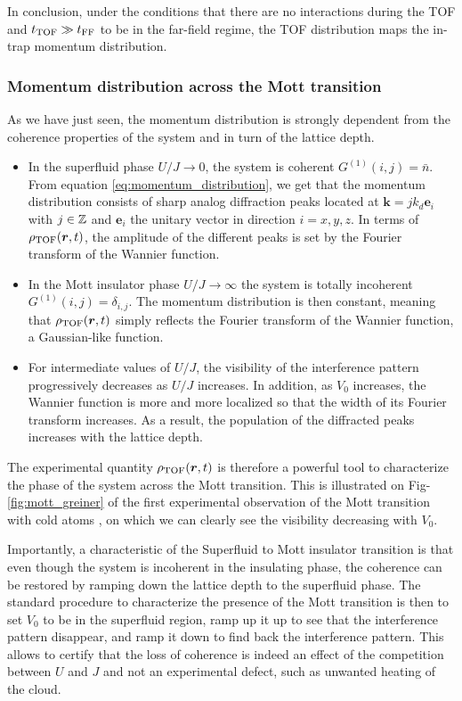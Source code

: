 In conclusion, under the conditions that there are no interactions during the TOF and $t_{\rm{TOF}} \gg t_{\rm{FF}}$ to be in the far-field regime, the TOF distribution maps the in-trap momentum distribution. 

\subsubsection{Momentum distribution across the Mott transition}

As we have just seen, the momentum distribution is strongly dependent from the coherence properties of the system and in turn of the lattice depth.

\begin{itemize}
    \item In the superfluid phase $U/J \to 0$, the system is coherent $G^{(1)}(i,j) = \bar{n}$. From equation \ref{eq:momentum_distribution}, we get that the momentum distribution consists of sharp analog diffraction peaks located at $\bm{k} = j k_d \bm{e}_i$ with $j \in \mathbb{Z}$ and $\bm{e}_i$ the unitary vector in direction $i=x,y,z$. In terms of $\rho_{\rm{TOF}}(\bm{r},t)$, the amplitude of the different peaks is set by the Fourier transform of the Wannier function. 
    
    \item In the Mott insulator phase $U/J \to \infty$ the system is totally incoherent $G^{(1)}(i,j) = \delta_{i,j}$. The momentum distribution is then constant, meaning that $\rho_{\rm{TOF}}(\bm{r},t)$ simply reflects the Fourier transform of the Wannier function, \ie a Gaussian-like function.
    
    \item For intermediate values of $U/J$, the visibility of the interference pattern progressively decreases as $U/J$ increases. In addition, as $V_0$ increases, the Wannier function is more and more localized so that the width of its Fourier transform increases. As a result, the population of the diffracted peaks increases with the lattice depth.
\end{itemize}

The experimental quantity $\rho_{\rm{TOF}}(\bm{r},t)$ is therefore a powerful tool to characterize the phase of the system across the Mott transition. This is illustrated on Fig-\ref{fig:mott_greiner} of the first experimental observation of the Mott transition with cold atoms \cite{greiner2002quantum}, on which we can clearly see the visibility decreasing with $V_0$.

Importantly, a characteristic of the Superfluid to Mott insulator transition is that even though the system is incoherent in the insulating phase, the coherence can be restored by ramping down the lattice depth to the superfluid phase. The standard procedure to characterize the presence of the Mott transition is then to set $V_0$ to be in the superfluid region, ramp up it up to see that the interference pattern disappear, and ramp it down to find back the interference pattern. This allows to certify that the loss of coherence is indeed an effect of the competition between $U$ and $J$ and not an experimental defect, such as unwanted heating of the cloud.

